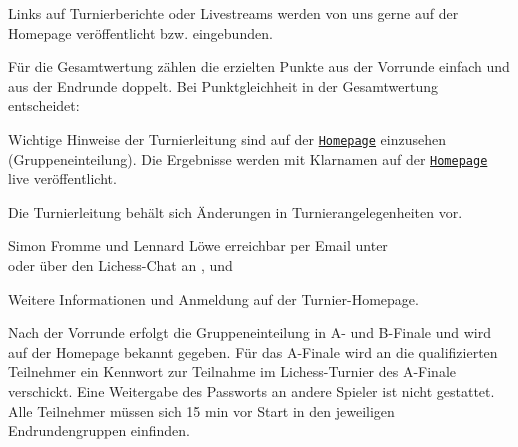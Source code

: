 \documentclass[paper=a4, fontsize=10pt]{scrartcl}
\begin{document}
\begin{description}[leftmargin=\dimexpr\wd\descbox+\labelsep,align=Left]
\item[Streaming:]

  Links auf Turnierberichte oder Livestreams werden von uns gerne auf
  der Homepage veröffentlicht bzw. eingebunden.

\item[weitere Hinweise:]

  Für die Gesamtwertung zählen die erzielten Punkte aus der Vorrunde
  einfach und aus der Endrunde doppelt.  Bei Punktgleichheit in der
  Gesamtwertung entscheidet:

  \enum{\tiebreak}

  Wichtige Hinweise der Turnierleitung sind auf der
  \href{\tournamentURL}{\texttt{Homepage}} einzusehen
  (Gruppeneinteilung). Die Ergebnisse werden mit Klarnamen auf der
  \href{\tournamentURL}{\texttt{Homepage}} live veröffentlicht.

  Die Turnierleitung behält sich Änderungen in Turnierangelegenheiten
  vor.

\item[Ansprechpartner, Turnierleitung und Infos:]

  Simon Fromme und Lennard Löwe erreichbar per Email unter
  \\ \email{\tournamentEmail} oder über den Lichess-Chat an
  ,  und

  Weitere Informationen und Anmeldung auf der Turnier-Homepage.

  Nach der Vorrunde erfolgt die Gruppeneinteilung in A- und B-Finale
  und wird auf der Homepage bekannt gegeben. Für das A-Finale wird an
  die qualifizierten Teilnehmer ein Kennwort zur Teilnahme im
  Lichess-Turnier des A-Finale verschickt. Eine Weitergabe des
  Passworts an andere Spieler ist nicht gestattet. Alle Teilnehmer
  müssen sich 15 min vor Start in den jeweiligen Endrundengruppen
  einfinden.
\end{description}
\end{document}
